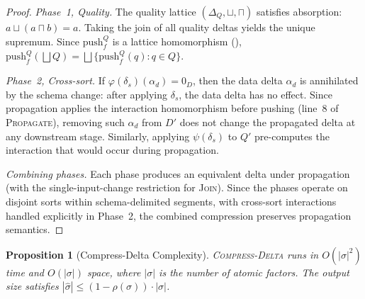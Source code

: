 \documentclass[11pt,a4paper]{article}
\newtheorem{proposition}[theorem]{Proposition}
\theoremstyle{definition}
\newcommand{\DeltaQ}{\Delta_{\!Q}}
\newcommand{\zeroD}{0_D}
\newcommand{\push}{\mathrm{push}}
\begin{document}
\begin{proof}
\emph{Phase~1, Quality.}  The quality lattice $(\DeltaQ, \sqcup, \sqcap)$
satisfies absorption: $a \sqcup (a \sqcap b) = a$.  Taking the join of all
quality deltas yields the unique supremum.  Since $\push_f^Q$ is a lattice
homomorphism (), $\push_f^Q(\bigsqcup Q) = \bigsqcup
\{\push_f^Q(q) : q \in Q\}$.

\emph{Phase~2, Cross-sort.}  If $\varphi(\delta_s)(\alpha_d) = \zeroD$,
then the data delta $\alpha_d$ is annihilated by the schema change: after
applying $\delta_s$, the data delta has no effect.  Since propagation
applies the interaction homomorphism before pushing (line~8 of
\textsc{Propagate}), removing such $\alpha_d$ from $D'$ does not change
the propagated delta at any downstream stage.  Similarly, applying
$\psi(\delta_s)$ to $Q'$ pre-computes the interaction that would occur
during propagation.

\emph{Combining phases.}  Each phase produces an equivalent delta under
propagation (with the single-input-change restriction for \textsc{Join}).
Since the phases operate on disjoint sorts within schema-delimited
segments, with cross-sort interactions handled explicitly in Phase~2, the
combined compression preserves propagation semantics.
\end{proof}

\begin{proposition}[Compress-Delta Complexity]\label{prop:compress-complexity}
\textsc{Compress-Delta} runs in $O(|\sigma|^2)$ time and
$O(|\sigma|)$ space, where $|\sigma|$ is the number of atomic factors.
The output size satisfies $|\hat{\sigma}| \leq (1 - \rho(\sigma)) \cdot |\sigma|$.
\end{proposition}
\end{document}
